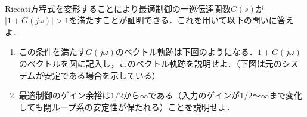 




\vspace{-2cm}
\item
Riccati方程式を変形することにより最適制御の一巡伝達関数$G(s)$が$|1+ G(j\omega)|>1$を満たすことが証明できる．これを用いて以下の問いに答えよ．
\begin{enumerate}
\item
この条件を満たす$G(j\omega)$のベクトル軌跡は下図のようになる．$1+G(j \omega)$のベクトルを図に記入し，このベクトル軌跡を説明せよ．（下図は元のシステムが安定である場合を示している）
\vspace{5cm}
\item
最適制御のゲイン余裕は$1/2$から$\infty$である（入力のゲインが$1/2$〜$\infty$まで変化しても閉ループ系の安定性が保たれる）ことを説明せよ．
\end{enumerate}
